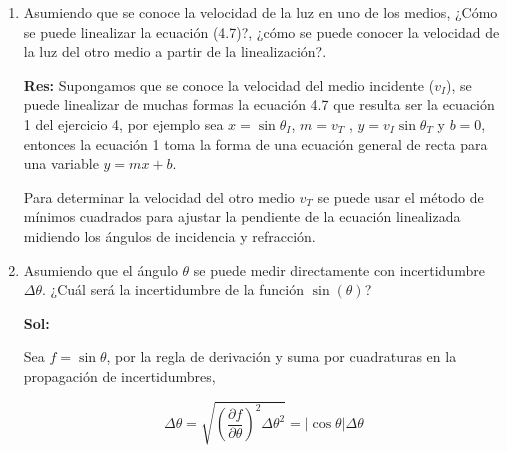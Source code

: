 \documentclass[12pt,a4paper]{article}
\begin{document}
\begin{enumerate}




\item Asumiendo que se conoce la velocidad de la luz en uno de los medios, ¿Cómo se puede linealizar la ecuación (4.7)?, ¿cómo se puede conocer la velocidad de la luz del otro medio a partir de la linealización?.

\textbf{Res:} Supongamos que se conoce la velocidad del medio incidente ($v_I$), se puede linealizar de muchas formas la ecuación 4.7 que resulta ser la ecuación 1 del ejercicio 4, por ejemplo sea $x = \sin{\theta_I}$, $m=v_T$ , $y= v_I \sin{\theta_T}$ y $b=0$, entonces la ecuación 1 toma la forma de una ecuación general de recta para una variable $y=mx +b$.



Para determinar la velocidad del otro medio $v_T$ se puede usar el método de mínimos cuadrados para ajustar la pendiente de la ecuación linealizada midiendo los ángulos de incidencia y refracción.












\item Asumiendo que el ángulo $\theta$ se puede medir directamente con incertidumbre $\Delta \theta$. ¿Cuál será la incertidumbre de la función $\sin{(\theta)}$?

\textbf{Sol:}

Sea $f= \sin{\theta}$, por la regla de derivación y suma por cuadraturas en la propagación de incertidumbres,

\begin{equation*}
    \Delta \theta = \sqrt{\left(\frac{\partial f}{\partial \theta}\right)^2 \Delta \theta^2} = |\cos{\theta}| \Delta \theta
\end{equation*}

    
    
\end{enumerate}
\end{document}
